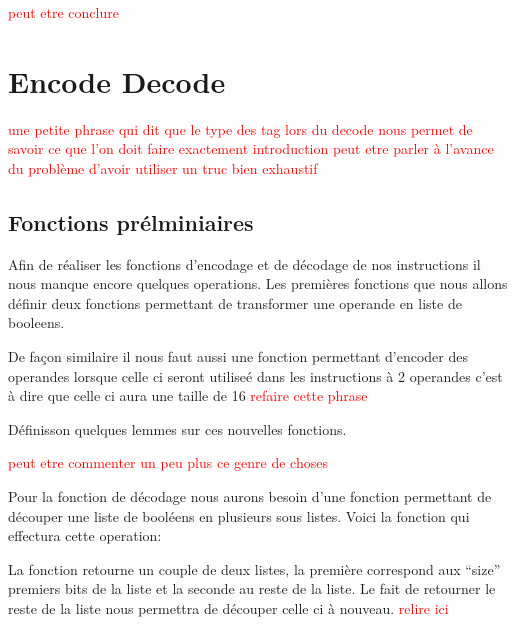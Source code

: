 \documentclass {article}
\newcommand{\codefrom}[3]
           {}
\theoremstyle{definition}
\theoremstyle{remark}
\newcommand{\todo}[1]{\textcolor{red}{#1}}
\begin{document}
\todo{peut etre conclure}


\section{Encode Decode}
\label{Encode Decode}

\todo{une petite phrase qui dit que le type des tag lors du decode nous permet de savoir ce que l'on doit faire exactement}
\todo{introduction peut etre parler à l'avance du problème d'avoir utiliser un truc bien exhaustif}



\subsection{Fonctions prélminiaires}

Afin de réaliser les fonctions d'encodage et de décodage de nos instructions il nous manque encore quelques operations.
Les premières fonctions que nous allons définir deux fonctions permettant de transformer une operande en liste de booleens.

\codefrom{src}{encode}{operand_to_bin}

De façon similaire il nous faut aussi une fonction permettant d'encoder des operandes lorsque celle ci seront utiliseé dans
les instructions à 2 operandes c'est à dire que celle ci aura une taille de 16 \todo{refaire cette phrase}

\codefrom{src}{encode}{operand_to_bin_double}

Définisson quelques lemmes sur ces nouvelles fonctions.
\codefrom{src}{encode}{operand_to_bin_hypothesis_reg}
\codefrom{src}{encode}{operand_to_bin_hypothesis_imm}
\codefrom{src}{encode}{operand_to_bin_size}
\todo{peut etre commenter un peu plus ce genre de choses}


Pour la fonction de décodage nous aurons besoin d'une fonction permettant de découper
une liste de booléens en plusieurs sous listes. Voici la fonction qui effectura cette operation:

\codefrom{src}{encode}{get_first_n_bit}

La fonction retourne un couple de deux listes, la première correspond aux ``size'' premiers
bits de la liste et la seconde au reste  de la liste. Le fait de retourner le reste de la liste
nous permettra de découper celle ci à nouveau.
\todo{relire ici}
\end{document}
